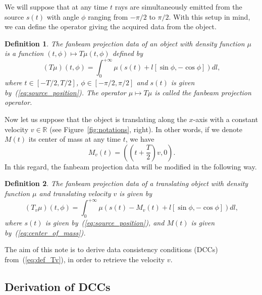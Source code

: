 \documentclass[a4paper]{article}
\numberwithin{equation}{section}
\newcommand{\R}{\mathbb{R}}
\newtheorem{definition}{Definition}
\begin{document}
We will suppose that at any time $t$ rays are simultaneously emitted from the source $s(t)$ with angle $\phi$ ranging from $-\pi/2$ to $\pi/2$. With this setup in mind, we can define the operator giving the acquired data from the object.
\begin{definition}
The \emph{fanbeam projection data} of an object with density function $\mu$ is a function $(t,\phi) \mapsto T\mu(t,\phi)$ defined by
\begin{equation}
	(T\mu)(t,\phi) = \int_0^{+\infty} \mu \left( s(t) + l \left[ \sin \phi, -\cos \phi \right] \right) dl,
\end{equation}
where $t \in \left[ -T/2, T/2\right]$, $\phi \in \left[ -\pi/2, \pi/2\right]$ and $s(t)$ is given by~(\ref{eq:source_position}). The operator $\mu \mapsto T\mu$ is called the \emph{fanbeam projection operator}.
\end{definition}


Now let us suppose that the object is translating along the $x$-axis with a constant velocity $v \in \R$ (see Figure~\ref{fig:notations}, right). In other words, if we denote $M(t)$ its center of mass at any time $t$, we have
\begin{equation}
	M_v(t) =  \left( \left( t + \frac{T}{2} \right)v, 0 \right).
\label{eq:center_of_mass}
\end{equation}
In this regard, the fanbeam projection data will be modified in the following way.
\begin{definition}
The \emph{fanbeam projection data of a translating object} with density function $\mu$ and translating velocity $v$ is given by
\begin{equation}
	(T_v\mu)(t,\phi) = \int_0^{+\infty} \mu \left( s(t) - M_v(t) + l \left[ \sin \phi, -\cos \phi \right] \right) dl,
\label{eq:def_Tv}
\end{equation}
where $s(t)$ is given by~(\ref{eq:source_position}), and $M(t)$ is given by~(\ref{eq:center_of_mass}).
\end{definition}

The aim of this note is to derive data consistency conditions (DCCs) from~(\ref{eq:def_Tv}), in order to retrieve the velocity $v$.

\subsection{Derivation of DCCs}
\end{document}
